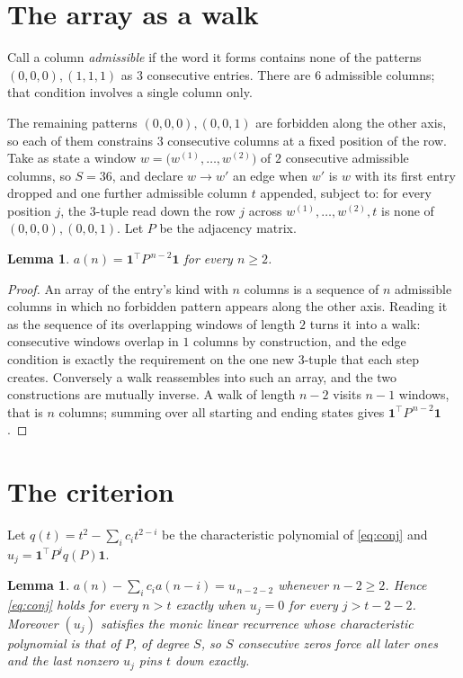 \documentclass[11pt,a4paper]{article}
\theoremstyle{plain}
\newtheorem{lemma}[theorem]{Lemma}
\theoremstyle{definition}
\begin{document}
\section{The array as a walk}

Call a column \emph{admissible} if the word it forms contains none of the patterns
$(0,0,0), (1,1,1)$ as $3$ consecutive entries. There are $6$ admissible columns; that condition
involves a single column only.

The remaining patterns $(0,0,0), (0,0,1)$ are forbidden along the other axis, so each of them
constrains $3$ consecutive columns at a fixed position of the row. Take as state a
window $w=\bigl(w^{(1)},\dots,w^{(2)}\bigr)$ of $2$ consecutive admissible
columns, so $S=36$, and declare $w\to w'$ an edge when $w'$ is $w$ with its first entry
dropped and one further admissible column $t$ appended, subject to: for every position
$j$, the $3$-tuple read down the row $j$ across $w^{(1)},\dots,w^{(2)},t$
is none of $(0,0,0), (0,0,1)$. Let $P$ be the adjacency matrix.

\begin{lemma}\label{lem:walk}
$a(n)=\mathbf{1}^{\!\top}P^{\,n-2}\mathbf{1}$ for every $n\ge2$.
\end{lemma}

\begin{proof}
An array of the entry's kind with $n$ columns is a sequence of $n$ admissible columns in
which no forbidden pattern appears along the other axis. Reading it as the sequence of its
overlapping windows of length $2$ turns it into a walk: consecutive windows overlap in
$1$ columns by construction, and the edge condition is exactly the requirement on the one
new $3$-tuple that each step creates. Conversely a walk reassembles into such an array,
and the two constructions are mutually inverse. A walk of length $n-2$ visits $n-1$
windows, that is $n$ columns; summing over all starting and ending states gives
$\mathbf{1}^{\!\top}P^{\,n-2}\mathbf{1}$.
\end{proof}

\section{The criterion}

Let $q(t)=t^{2}-\sum_i c_i t^{2-i}$ be the characteristic polynomial of
\eqref{eq:conj} and $u_j=\mathbf{1}^{\!\top}P^{j}q(P)\mathbf{1}$.

\begin{lemma}\label{lem:crit}
$a(n)-\sum_i c_i a(n-i)=u_{\,n-2-2}$ whenever $n-2\ge2$. Hence
\eqref{eq:conj} holds for every $n>t$ exactly when $u_j=0$ for every
$j>t-2-2$. Moreover $(u_j)$ satisfies the monic linear recurrence whose
characteristic polynomial is that of $P$, of degree $S$, so $S$ consecutive zeros force all
later ones and the last nonzero $u_j$ pins $t$ down exactly.
\end{lemma}
\end{document}
